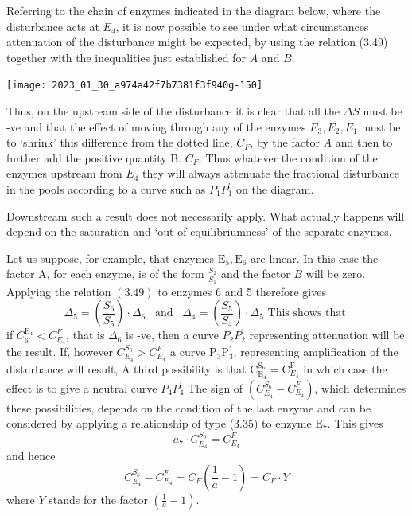 Referring to the chain of enzymes indicated in the diagram below, where the disturbance acts at $E_{4}$, it is now possible to see under what circumstances attenuation of the disturbance might be expected, by using the relation (3.49) together with the inequalities just established for $A$ and $B$.

\begin{center}
\texttt{[image: 2023\_01\_30\_a974a42f7b7381f3f940g-150]}
\end{center}

Thus, on the upstream side of the disturbance it is clear that all the $\Delta S$ must be -ve and that the effect of moving through any of the enzymes $E_{3}, E_{2}, E_{1}$ must be to `shrink' this difference from the dotted line, $C_{F}$, by the factor $A$ and then to further add the positive quantity B. $C_{F}$. Thus whatever the condition of the enzymes upstream from $E_{4}$ they will always attenuate the fractional disturbance in the pools according to a curve such as $P_{1} P_{1}^{\prime}$ on the diagram.

Downstream such a result does not necessarily apply. What actually happens will depend on the saturation and `out of equilibriumness' of the separate enzymes.

Let us suppose, for example, that enzymes $\mathrm{E}_{5}, \mathrm{E}_{6}$ are linear. In this case the factor A, for each enzyme, is of the form $\frac{S_{2}}{S_{1}}$ and the factor $B$ will be zero. Applying the relation $(3.49)$ to enzymes 6 and 5 therefore gives
%
$$
\Delta_{5}=\left(\frac{S_{6}}{S_{5}}\right) \cdot \Delta_{6}\hspace{6pt} \text { and } \hspace{6pt} \Delta_{4}=\left(\frac{S_{5}}{S_{4}}\right) \cdot \Delta_{5} \text { This shows that }
$$
%
if $C_6^{\mathrm{E_4}} < C^F_{E_4}$, that is $\Delta_{6}$ is -ve, then a curve $P_{2} P_{2}^{\prime}$ representing attenuation will be the result. If, however $C_{E_4}^{S_6} > C_{E_4}^{F}$ a curve $\mathrm{P}_{3} \mathrm{P}_{3}^{\prime}$, representing amplification of the disturbance will result, A third possibility is that $\mathrm{C}_{\mathrm{E_4}}^{\mathrm{S}_{6}} = \mathrm{C}_{E_4}^{\mathrm{F}}$ in which case the effect is to give a neutral curve $P_{4} P_4^{\prime}$ The sign of $\left(C_{E_4}^{S_6} - C_{E_4}^{F}\right)$, which determines these possibilities, depends on the condition of the last enzyme and can be considered by applying a relationship of type (3.35) to enzyme $\mathrm{E}_{7}$. This gives
%
$$
a_{7} \cdot C_{E_4}^{S_{6}} = C_{E_4}^{F}
$$
%
and hence
%
$$
C_{E_4}^{S_{6}}-C_{E_4}^{F} = C_{F}\left(\frac{1}{a}-1\right)=C_{F} \cdot Y
$$
%
where $Y$ stands for the factor $\left(\frac{1}{a}-1\right)$.

